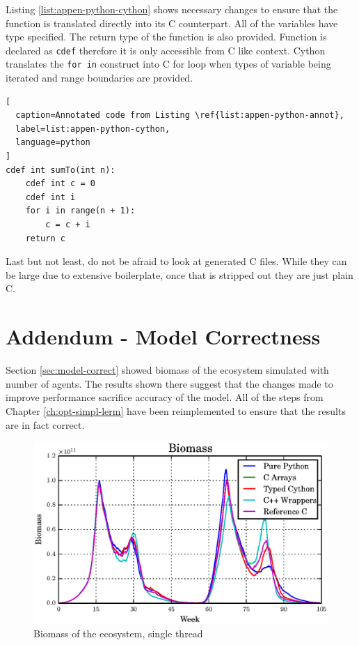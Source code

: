 \documentclass[12pt, a4paper]{report}
\begin{document}
\begin{appendices}
Listing \ref{list:appen-python-cython} shows necessary changes to ensure that the
function is translated directly into its C counterpart. All of the variables
have type specified. The return type of the function is also provided. Function
is declared as \lstinline{cdef} therefore it is only accessible from C like context.
Cython translates the \lstinline{for in} construct into C for loop when types of
variable being iterated and range boundaries are provided.

\begin{lstlisting}[
  caption=Annotated code from Listing \ref{list:appen-python-annot},
  label=list:appen-python-cython,
  language=python
]
cdef int sumTo(int n):
    cdef int c = 0
    cdef int i
    for i in range(n + 1):
        c = c + i
    return c
\end{lstlisting}

Last but not least, do not be afraid to look at generated C files. While they
can be large due to extensive boilerplate, once that is stripped out they are
just plain C.

\chapter{Addendum - Model Correctness}\label{appen-ch:add-model-correctness}
Section \ref{sec:model-correct} showed biomass of the ecosystem simulated with number
of agents. The results shown there suggest that the changes made to improve performance
sacrifice accuracy of the model. All of the steps from Chapter \ref{ch:opt-simpl-lerm}
have been reimplemented to ensure that the results are in fact correct.

\begin{figure}[H]
  \begin{center}
    \includegraphics[width=\columnwidth]{graphs/bio-fixed-single-float-comp.eps}
    \caption{Biomass of the ecosystem, single thread}
    \label{fig:bio-fixed-single-float-comp}
  \end{center}
\end{figure}


\end{appendices}
\end{document}
